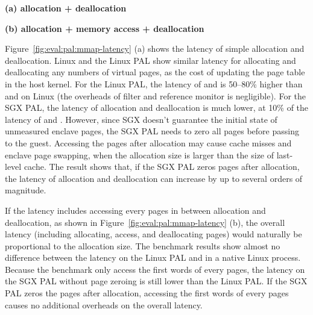 \begin{figure*}[t!]
\centering
\footnotesize
{}
\parbox{0.49\textwidth}{\centering\bf (a) allocation + deallocation}
\parbox{0.49\textwidth}{\centering\bf (b) allocation + memory access + deallocation}
\caption{Latency of (a) allocating and deallocating a range of virtual pages, and (b) the same operations with writing to each page after allocation. Lower is better.
The comparison is between (1)  and  on Linux; (2)  and  on the Linux PAL, with and without a \seccomp{} filter ({\bf +SC}) and reference monitor ({\bf +RM}); (3) the same \hostapis{} on the SGX PAL, with and without zeroing the pages before use ({\bf +Zero}).}
\label{fig:eval:pal:mmap-latency}
\end{figure*}


Figure~\ref{fig:eval:pal:mmap-latency} (a)
shows the latency of
simple allocation and deallocation.
Linux and the Linux PAL
show similar latency for allocating and deallocating any numbers
of virtual pages,
as the cost of updating the page table
in the host kernel.
For the Linux PAL, the latency
of  and   is 50--80\% higher
than  and  on Linux
(the overheads of \seccomp{} filter and reference monitor is negligible).
For the SGX PAL,
the latency of allocation and deallocation
is much lower,
at \roughly{}10\% of the latency of  and .
However,
since SGX doesn't guarantee the initial state of unmeasured enclave pages,
the SGX PAL needs to zero all pages
before passing to the guest.
Accessing the pages after allocation
may cause cache misses and enclave page swapping,
when the allocation size
is larger than the size of last-level cache.
The result shows that,
if the SGX PAL zeros pages after allocation,
the latency of allocation and deallocation can increase by up to several orders of magnitude.



If the latency includes accessing every pages in between allocation and deallocation,
as shown in Figure~\ref{fig:eval:pal:mmap-latency} (b),
the overall latency (including allocating, access, and deallocating pages) would
naturally be proportional to the allocation size.
The benchmark results show almost no difference
between the latency on the Linux PAL and in a native Linux process.
Because the benchmark only access the first words
of every pages,
the latency on the SGX PAL without page zeroing
is still lower than the Linux PAL.
If the SGX PAL zeros the pages after allocation,
accessing the first words
of every pages causes no additional overheads
on the overall latency.








